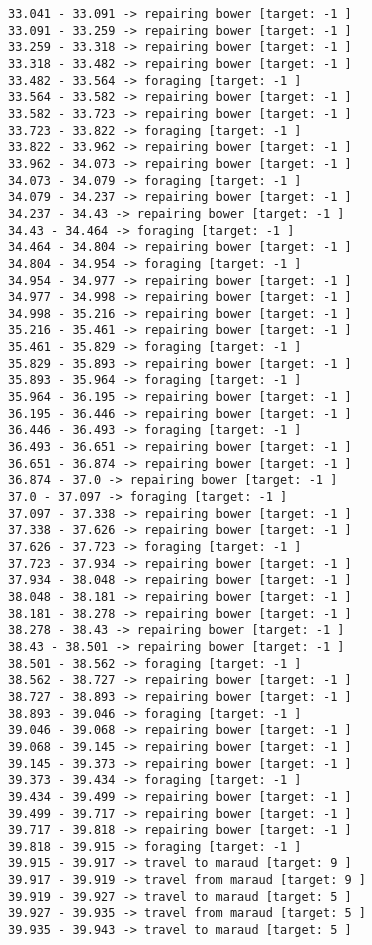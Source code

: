 \documentclass[11pt]{article}
\begin{document}
\begin{Verbatim}[commandchars=\\\{\}]
33.041 - 33.091 -> repairing bower [target: -1 ]
33.091 - 33.259 -> repairing bower [target: -1 ]
33.259 - 33.318 -> repairing bower [target: -1 ]
33.318 - 33.482 -> repairing bower [target: -1 ]
33.482 - 33.564 -> foraging [target: -1 ]
33.564 - 33.582 -> repairing bower [target: -1 ]
33.582 - 33.723 -> repairing bower [target: -1 ]
33.723 - 33.822 -> foraging [target: -1 ]
33.822 - 33.962 -> repairing bower [target: -1 ]
33.962 - 34.073 -> repairing bower [target: -1 ]
34.073 - 34.079 -> foraging [target: -1 ]
34.079 - 34.237 -> repairing bower [target: -1 ]
34.237 - 34.43 -> repairing bower [target: -1 ]
34.43 - 34.464 -> foraging [target: -1 ]
34.464 - 34.804 -> repairing bower [target: -1 ]
34.804 - 34.954 -> foraging [target: -1 ]
34.954 - 34.977 -> repairing bower [target: -1 ]
34.977 - 34.998 -> repairing bower [target: -1 ]
34.998 - 35.216 -> repairing bower [target: -1 ]
35.216 - 35.461 -> repairing bower [target: -1 ]
35.461 - 35.829 -> foraging [target: -1 ]
35.829 - 35.893 -> repairing bower [target: -1 ]
35.893 - 35.964 -> foraging [target: -1 ]
35.964 - 36.195 -> repairing bower [target: -1 ]
36.195 - 36.446 -> repairing bower [target: -1 ]
36.446 - 36.493 -> foraging [target: -1 ]
36.493 - 36.651 -> repairing bower [target: -1 ]
36.651 - 36.874 -> repairing bower [target: -1 ]
36.874 - 37.0 -> repairing bower [target: -1 ]
37.0 - 37.097 -> foraging [target: -1 ]
37.097 - 37.338 -> repairing bower [target: -1 ]
37.338 - 37.626 -> repairing bower [target: -1 ]
37.626 - 37.723 -> foraging [target: -1 ]
37.723 - 37.934 -> repairing bower [target: -1 ]
37.934 - 38.048 -> repairing bower [target: -1 ]
38.048 - 38.181 -> repairing bower [target: -1 ]
38.181 - 38.278 -> repairing bower [target: -1 ]
38.278 - 38.43 -> repairing bower [target: -1 ]
38.43 - 38.501 -> repairing bower [target: -1 ]
38.501 - 38.562 -> foraging [target: -1 ]
38.562 - 38.727 -> repairing bower [target: -1 ]
38.727 - 38.893 -> repairing bower [target: -1 ]
38.893 - 39.046 -> foraging [target: -1 ]
39.046 - 39.068 -> repairing bower [target: -1 ]
39.068 - 39.145 -> repairing bower [target: -1 ]
39.145 - 39.373 -> repairing bower [target: -1 ]
39.373 - 39.434 -> foraging [target: -1 ]
39.434 - 39.499 -> repairing bower [target: -1 ]
39.499 - 39.717 -> repairing bower [target: -1 ]
39.717 - 39.818 -> repairing bower [target: -1 ]
39.818 - 39.915 -> foraging [target: -1 ]
39.915 - 39.917 -> travel to maraud [target: 9 ]
39.917 - 39.919 -> travel from maraud [target: 9 ]
39.919 - 39.927 -> travel to maraud [target: 5 ]
39.927 - 39.935 -> travel from maraud [target: 5 ]
39.935 - 39.943 -> travel to maraud [target: 5 ]

\end{Verbatim}
\end{document}
